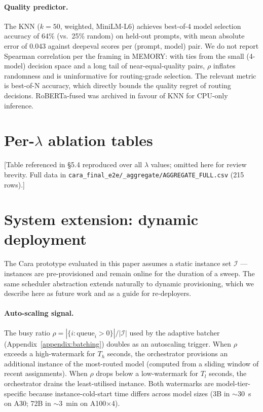 \documentclass[10pt]{article}
\begin{document}
\paragraph{Quality predictor.}
The KNN ($k{=}50$, weighted, MiniLM-L6) achieves best-of-4 model selection accuracy of 64\% (vs.\ 25\% random) on held-out prompts, with mean absolute error of 0.043 against deepeval scores per (prompt, model) pair. We do not report Spearman correlation per the framing in MEMORY: with ties from the small (4-model) decision space and a long tail of near-equal-quality pairs, $\rho$ inflates randomness and is uninformative for routing-grade selection. The relevant metric is best-of-N accuracy, which directly bounds the quality regret of routing decisions. RoBERTa-fused was archived in favour of KNN for CPU-only inference.

\section{Per-$\lambda$ ablation tables}\label{appendix:ablations}
[Table referenced in §5.4 reproduced over all $\lambda$ values; omitted here for review brevity. Full data in \texttt{cara\_final\_e2e/\_aggregate/AGGREGATE\_FULL.csv} (215 rows).]

\section{System extension: dynamic deployment}\label{appendix:dynamic}

The Cara prototype evaluated in this paper assumes a static instance set $\mathcal{I}$ — instances are pre-provisioned and remain online for the duration of a sweep. The same scheduler abstraction extends naturally to dynamic provisioning, which we describe here as future work and as a guide for re-deployers.

\paragraph{Auto-scaling signal.}
The busy ratio $\rho = |\{i : \text{queue}_i > 0\}| / |\mathcal{I}|$ used by the adaptive batcher (Appendix~\ref{appendix:batching}) doubles as an autoscaling trigger. When $\rho$ exceeds a high-watermark for $T_h$ seconds, the orchestrator provisions an additional instance of the most-routed model (computed from a sliding window of recent assignments). When $\rho$ drops below a low-watermark for $T_l$ seconds, the orchestrator drains the least-utilised instance. Both watermarks are model-tier-specific because instance-cold-start time differs across model sizes (3B in $\sim$30~s on A30; 72B in $\sim$3~min on A100$\times$4).
\end{document}
